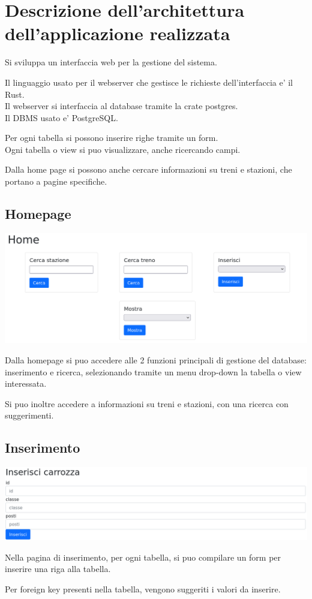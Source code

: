 \documentclass[a4paper,12pt]{report}
\begin{document}
	\section{Descrizione dell'architettura dell'applicazione realizzata}
	\par Si sviluppa un interfaccia web per la gestione del sistema.
	\par Il linguaggio usato per il webserver che gestisce le richieste dell'interfaccia e' il Rust.
	\\Il webserver si interfaccia al database tramite la crate postgres.
	\\Il DBMS usato e' PostgreSQL.
	\par Per ogni tabella si possono inserire righe tramite un form.
	\\Ogni tabella o view si puo visualizzare, anche ricercando campi.
	\par Dalla home page si possono anche cercare informazioni su treni e stazioni, che portano a pagine specifiche.

	\subsection{Homepage}
	\includegraphics[width=\linewidth]{res/screenshots/home.png}
	\par Dalla homepage si puo accedere alle 2 funzioni principali di gestione del database: inserimento e ricerca,
	selezionando tramite un menu drop-down la tabella o view interessata.
	\par Si puo inoltre accedere a informazioni su treni e stazioni, con una ricerca con suggerimenti.
	\subsection{Inserimento}
	\includegraphics[width=\linewidth]{res/screenshots/inserisci.png}
	\par Nella pagina di inserimento, per ogni tabella, si puo compilare un form per inserire una riga alla tabella.
	\par Per foreign key presenti nella tabella, vengono suggeriti i valori da inserire.
\end{document}

